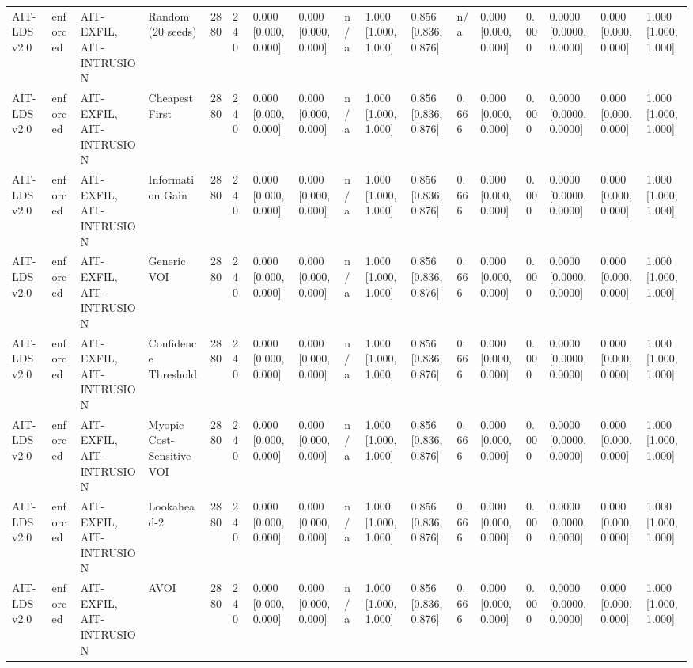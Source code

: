 \begin{table}[!ht]
{\begin{tabular}{lllllllllllllllll}
AIT-LDS v2.0 & enforced & AIT-EXFIL, AIT-INTRUSION & Random (20 seeds) & 2880 & 240 & 0.000 [0.000, 0.000] & 0.000 [0.000, 0.000] & n/a & 1.000 [1.000, 1.000] & 0.856 [0.836, 0.876] & n/a & 0.000 [0.000, 0.000] & 0.000 & 0.0000 [0.0000, 0.0000] & 0.000 [0.000, 0.000] & 1.000 [1.000, 1.000] \\
AIT-LDS v2.0 & enforced & AIT-EXFIL, AIT-INTRUSION & Cheapest First & 2880 & 240 & 0.000 [0.000, 0.000] & 0.000 [0.000, 0.000] & n/a & 1.000 [1.000, 1.000] & 0.856 [0.836, 0.876] & 0.666 & 0.000 [0.000, 0.000] & 0.000 & 0.0000 [0.0000, 0.0000] & 0.000 [0.000, 0.000] & 1.000 [1.000, 1.000] \\
AIT-LDS v2.0 & enforced & AIT-EXFIL, AIT-INTRUSION & Information Gain & 2880 & 240 & 0.000 [0.000, 0.000] & 0.000 [0.000, 0.000] & n/a & 1.000 [1.000, 1.000] & 0.856 [0.836, 0.876] & 0.666 & 0.000 [0.000, 0.000] & 0.000 & 0.0000 [0.0000, 0.0000] & 0.000 [0.000, 0.000] & 1.000 [1.000, 1.000] \\
AIT-LDS v2.0 & enforced & AIT-EXFIL, AIT-INTRUSION & Generic VOI & 2880 & 240 & 0.000 [0.000, 0.000] & 0.000 [0.000, 0.000] & n/a & 1.000 [1.000, 1.000] & 0.856 [0.836, 0.876] & 0.666 & 0.000 [0.000, 0.000] & 0.000 & 0.0000 [0.0000, 0.0000] & 0.000 [0.000, 0.000] & 1.000 [1.000, 1.000] \\
AIT-LDS v2.0 & enforced & AIT-EXFIL, AIT-INTRUSION & Confidence Threshold & 2880 & 240 & 0.000 [0.000, 0.000] & 0.000 [0.000, 0.000] & n/a & 1.000 [1.000, 1.000] & 0.856 [0.836, 0.876] & 0.666 & 0.000 [0.000, 0.000] & 0.000 & 0.0000 [0.0000, 0.0000] & 0.000 [0.000, 0.000] & 1.000 [1.000, 1.000] \\
AIT-LDS v2.0 & enforced & AIT-EXFIL, AIT-INTRUSION & Myopic Cost-Sensitive VOI & 2880 & 240 & 0.000 [0.000, 0.000] & 0.000 [0.000, 0.000] & n/a & 1.000 [1.000, 1.000] & 0.856 [0.836, 0.876] & 0.666 & 0.000 [0.000, 0.000] & 0.000 & 0.0000 [0.0000, 0.0000] & 0.000 [0.000, 0.000] & 1.000 [1.000, 1.000] \\
AIT-LDS v2.0 & enforced & AIT-EXFIL, AIT-INTRUSION & Lookahead-2 & 2880 & 240 & 0.000 [0.000, 0.000] & 0.000 [0.000, 0.000] & n/a & 1.000 [1.000, 1.000] & 0.856 [0.836, 0.876] & 0.666 & 0.000 [0.000, 0.000] & 0.000 & 0.0000 [0.0000, 0.0000] & 0.000 [0.000, 0.000] & 1.000 [1.000, 1.000] \\
AIT-LDS v2.0 & enforced & AIT-EXFIL, AIT-INTRUSION & AVOI & 2880 & 240 & 0.000 [0.000, 0.000] & 0.000 [0.000, 0.000] & n/a & 1.000 [1.000, 1.000] & 0.856 [0.836, 0.876] & 0.666 & 0.000 [0.000, 0.000] & 0.000 & 0.0000 [0.0000, 0.0000] & 0.000 [0.000, 0.000] & 1.000 [1.000, 1.000] \\

\end{tabular}}
\end{table}
